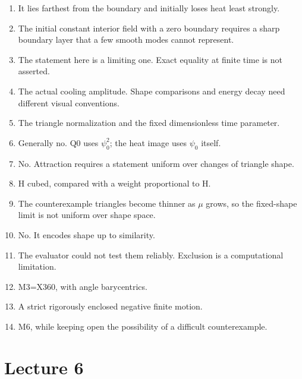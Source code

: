 \documentclass[11pt,oneside,openany]{book}
\begin{document}
\begin{enumerate}

\item It lies farthest from the boundary and initially loses heat least strongly.

\item The initial constant interior field with a zero boundary requires a sharp boundary layer that a few smooth modes cannot represent.

\item The statement here is a limiting one. Exact equality at finite time is not asserted.

\item The actual cooling amplitude. Shape comparisons and energy decay need different visual conventions.

\item The triangle normalization and the fixed dimensionless time parameter.

\item Generally no. $\mathrm{Q0}$ uses $\psi_0^2$; the heat image uses $\psi_0$ itself.

\item No. Attraction requires a statement uniform over changes of triangle shape.

\item H cubed, compared with a weight proportional to H.

\item The counterexample triangles become thinner as \ensuremath{\mu} grows, so the fixed-shape limit is not uniform over shape space.

\item No. It encodes shape up to similarity.

\item The evaluator could not test them reliably. Exclusion is a computational limitation.

\item M3=X360, with angle barycentrics.

\item A strict rigorously enclosed negative finite motion.

\item M6, while keeping open the possibility of a difficult counterexample.

\end{enumerate}

\section{Lecture 6}
\end{document}
